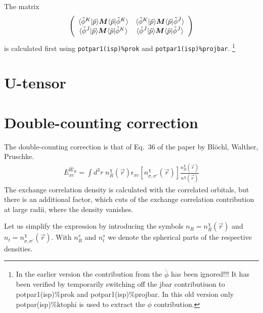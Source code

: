 \documentclass[11pt,a4paper]{report}
\begin{document}
The matrix 
\begin{eqnarray}
\left(\begin{array}{cc}
\langle\tilde{\phi}^{K}|\tilde{p}\rangle 
\bm{M}\langle\tilde{p}|\tilde{\phi}^{K}\rangle &
\langle\tilde{\phi}^{K}|\tilde{p}\rangle 
\bm{M}\langle\tilde{p}|\tilde{\phi}^{\bar{J}}\rangle \\
\langle\tilde{\phi}^{\bar{J}}|\tilde{p}\rangle 
\bm{M}\langle\tilde{p}|\tilde{\phi}^{K}\rangle &
\langle\tilde{\phi}^{\bar{J}}|\tilde{p}\rangle 
\bm{M}\langle\tilde{p}|\tilde{\phi}^{\bar{J}}\rangle \\
\end{array}\right)
\end{eqnarray}
is calculated first using \verb|potpar1(isp)%prok| and
\verb|potpar1(isp)%projbar|.
\footnote{ In the earlier version the contribution from the
  $\dot{\bar{\phi}}$ has been ignored!!! It has been verified by
  temporarily switching off the jbar contributiuon to
  potpar1(isp)\%prok and potpar1(isp)\%projbar. In this old version
  only potpar(isp)\%ktophi is used to extract the $\phi$
  contribution.}

\section{U-tensor}
\section{Double-counting correction}
The double-counting correction is that of Eq.~36 of the paper by
Bl\"ochl, Walther, Pruschke\cite{bloechl11_prb84_205101}.
\begin{eqnarray}
E_{xc}^{\hat{W}_R}=\int d^3r\; n^\chi_R(\vec{r})
\epsilon_{xc}[n^\chi_{\sigma,\sigma'}(\vec{r})]
\frac{n^\chi_R(\vec{r})}{n^\chi(\vec{r})}
\end{eqnarray}
The exchange correlation density is calculated with the correlated
orbitals, but there is an additional factor, which cuts of the
exchange correlation contribution at large radii, where the density
vanishes.

Let us simplify the expression by introducing the symbols
$n_R=n^\chi_R(\vec{r})$ and $n_t=n^\chi_{\sigma,\sigma'}(\vec{r})$.
With $n^s_R$ and $n^s_t$ we denote the spherical parts of the
respective densities.
\end{document}
